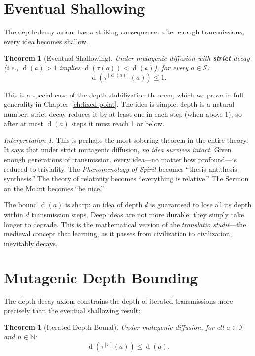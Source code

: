 \documentclass[11pt,openany]{book}
\theoremstyle{definition}
\theoremstyle{plain}
\newtheorem{theorem}[axiom]{Theorem}
\theoremstyle{remark}
\newtheorem{interpretation}[axiom]{Interpretation}
\newcommand{\IS}{\mathcal{I}}               %
\newcommand{\depth}{\operatorname{d}}       %
\newcommand{\transmit}{\tau}                 %
\begin{document}
\section{Eventual Shallowing}

The depth-decay axiom has a striking consequence: after enough transmissions, every idea becomes shallow.

\begin{theorem}[Eventual Shallowing]
\label{thm:eventual-shallow}
Under mutagenic diffusion with \textbf{strict} decay (i.e., $\depth(a) > 1$ implies $\depth(\transmit(a)) < \depth(a)$), for every $a \in \IS$:
\[
\depth(\transmit^{[\depth(a)]}(a)) \leq 1.
\]
\end{theorem}

This is a special case of the depth stabilization theorem, which we prove in full generality in Chapter~\ref{ch:fixed-point}. The idea is simple: depth is a natural number, strict decay reduces it by at least one in each step (when above 1), so after at most $\depth(a)$ steps it must reach 1 or below.

\begin{interpretation}
This is perhaps the most sobering theorem in the entire theory. It says that under strict mutagenic diffusion, \emph{no idea survives intact}. Given enough generations of transmission, every idea---no matter how profound---is reduced to triviality. The \emph{Phenomenology of Spirit} becomes ``thesis-antithesis-synthesis.'' The theory of relativity becomes ``everything is relative.'' The Sermon on the Mount becomes ``be nice.''

The bound $\depth(a)$ is sharp: an idea of depth $d$ is guaranteed to lose all its depth within $d$ transmission steps. Deep ideas are not more durable; they simply take longer to degrade. This is the mathematical version of the \emph{translatio studii}---the medieval concept that learning, as it passes from civilization to civilization, inevitably decays.
\end{interpretation}

\section{Mutagenic Depth Bounding}

The depth-decay axiom constrains the depth of iterated transmissions more precisely than the eventual shallowing result:

\begin{theorem}[Iterated Depth Bound]
\label{thm:iterated-depth}
Under mutagenic diffusion, for all $a \in \IS$ and $n \in \mathbb{N}$:
\[
\depth(\transmit^{[n]}(a)) \leq \depth(a).
\]
\end{theorem}
\end{document}
